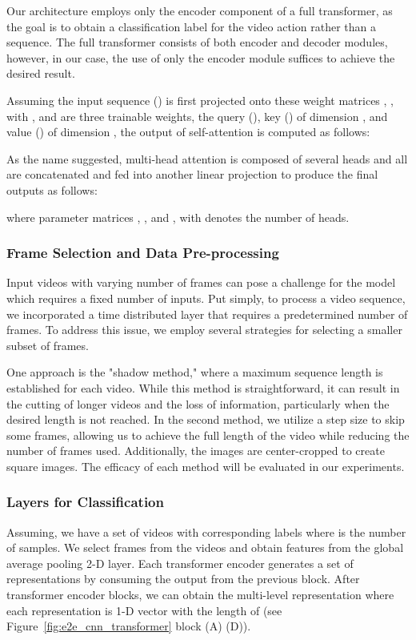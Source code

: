 \documentclass[fleqn,10pt]{wlscirep}
\begin{document}
Our architecture employs only the encoder component of a full transformer, as the goal is to obtain a classification label for the video action rather than a sequence. The full transformer consists of both encoder and decoder modules, however, in our case, the use of only the encoder module suffices to achieve the desired result.

Assuming the input sequence () is first projected onto these weight matrices , ,  with , and  are three trainable weights, the query (), key () of dimension , and value () of dimension , the output of self-attention is computed as follows:

As the name suggested, multi-head attention is composed of several heads and all are concatenated and fed into another linear projection to produce the final outputs as follows:

where parameter matrices , ,  and ,  with  denotes the number of heads.

\subsubsection{Frame Selection and Data Pre-processing}


Input videos with varying number of frames can pose a challenge for the model which requires a fixed number of inputs. Put simply, to process a video sequence, we incorporated a time distributed layer that requires a predetermined number of frames. To address this issue, we employ several strategies for selecting a smaller subset of frames.

One approach is the "shadow method," where a maximum sequence length is established for each video. While this method is straightforward, it can result in the cutting of longer videos and the loss of information, particularly when the desired length is not reached. In the second method, we utilize a step size to skip some frames, allowing us to achieve the full length of the video while reducing the number of frames used. Additionally, the images are center-cropped to create square images. The efficacy of each method will be evaluated in our experiments.
\subsubsection{Layers for Classification}
Assuming, we have a set of videos  with corresponding labels  where  is the number of samples. We select  frames from the videos and obtain  features from the global average pooling 2-D layer. Each transformer encoder generates a set of representations by consuming the output from the previous block. After  transformer encoder blocks, we can obtain the multi-level representation  where each representation is 1-D vector with the length of  (see Figure~\ref{fig:e2e_cnn_transformer} block (A)  (D)). 
\end{document}
